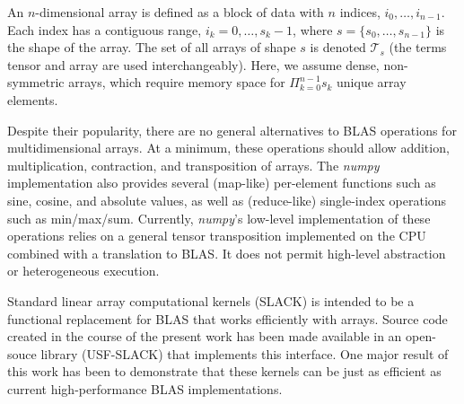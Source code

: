 \documentclass[preprint]{sigplanconf}
\begin{document}
  An $n$-dimensional array is defined as a block of data with $n$ indices, $i_0, \ldots, i_{n-1}$.
Each index has a contiguous range, $i_k = 0,\ldots,s_k-1$, where $s = \{s_0,\ldots,s_{n-1}\}$
is the shape of the array.  The set of all arrays of shape $s$ is denoted $\mathcal T_s$ (the terms
tensor and array are used interchangeably).
Here, we assume dense, non-symmetric arrays, which require memory space for
$\Pi_{k=0}^{n-1} s_k$ unique array elements.

  Despite their popularity, there are no general alternatives to BLAS operations for multidimensional
arrays.  At a minimum, these operations should allow addition, multiplication, contraction,
and transposition of arrays.  The {\em numpy} implementation also provides
several (map-like) per-element functions such as sine, cosine, and absolute values,
as well as (reduce-like) single-index operations such as min/max/sum.
Currently, {\em numpy}'s low-level implementation of these operations relies on a general
tensor transposition implemented on the CPU combined with a translation to BLAS.
It does not permit high-level abstraction or heterogeneous execution.

  Standard linear array computational kernels (SLACK) is intended to be a functional
replacement for BLAS that works efficiently with arrays.
Source code created in the course of the present work has been
made available in an open-souce library (USF-SLACK) that implements
this interface.  One major result of this work has been to demonstrate
that these kernels can be just as efficient as current high-performance
BLAS implementations.
\end{document}
